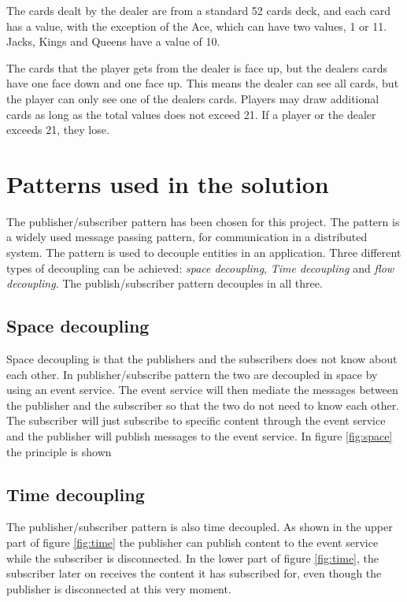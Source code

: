 The cards dealt by the dealer are from a standard 52 cards deck, and each card has a value, with the exception of the Ace, which can have two values, 1 or 11. Jacks, Kings and Queens have a value of 10.  

The cards that the player gets from the dealer is face up, but the dealers cards have one face down and one face up. This means the dealer can see all cards, but the player can only see one of the dealers cards. Players may draw additional cards as long as the total values does not exceed 21. If a player or the dealer exceeds 21, they lose. 

\section{Patterns used in the solution}
\label{chp:patterns}
The publisher/subscriber pattern has been chosen for this project. The pattern is a widely used message passing pattern, for communication in a distributed system. The pattern is used to decouple entities in an application. Three different types of decoupling can be achieved: \emph{space decoupling}, \emph{Time decoupling} and \emph{flow decoupling}. The publish/subscriber pattern decouples in all three.

\subsection{Space decoupling}
Space decoupling is that the publishers and the subscribers does not know about each other. In publisher/subscribe pattern the two are decoupled in space by using an event service. The event service will then mediate the messages between the publisher and the subscriber so that the two do not need to know each other. The subscriber will just subscribe to specific content through the event service and the publisher will publish messages to the event service. In figure \ref{fig:space} the principle is shown


\subsection{Time decoupling}
The publisher/subscriber pattern is also time decoupled. As shown in the upper part of figure \ref{fig:time} the publisher can publish content to the event service while the subscriber is disconnected. In the lower part of figure \ref{fig:time}, the subscriber later on receives the content it has subscribed for, even though the publisher is disconnected at this very moment.

